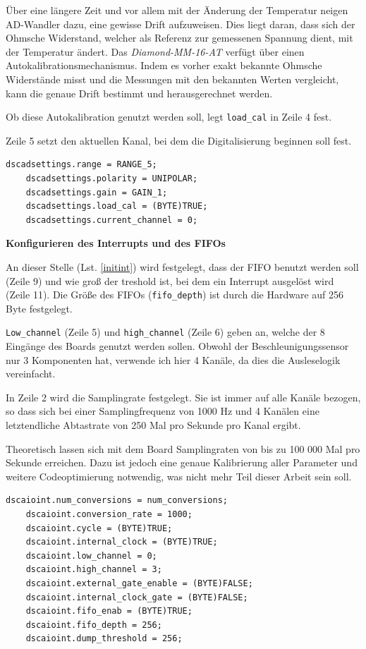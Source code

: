 \documentclass[12pt,a4paper]{scrartcl}
\begin{document}
Über eine längere Zeit und vor allem mit der Änderung der Temperatur neigen AD-Wandler dazu, eine gewisse Drift aufzuweisen. Dies liegt daran, dass sich der Ohmsche Widerstand, welcher als Referenz zur gemessenen Spannung dient, mit der Temperatur ändert. Das \textit{Diamond-MM-16-AT} verfügt über einen Autokalibrationsmechanismus. Indem es vorher exakt bekannte Ohmsche Widerstände misst und die Messungen mit den bekannten Werten vergleicht, kann die genaue Drift bestimmt und herausgerechnet werden\citep[siehe auch][]{Miller:2006fk}.

Ob diese Autokalibration genutzt werden soll, legt \texttt{load\_cal} in Zeile 4 fest.

Zeile 5 setzt den aktuellen Kanal, bei dem die Digitalisierung beginnen soll fest.

\begin{lstlisting}[frame=trBL]
	dscadsettings.range = RANGE_5;
	dscadsettings.polarity = UNIPOLAR;
	dscadsettings.gain = GAIN_1;
	dscadsettings.load_cal = (BYTE)TRUE;
	dscadsettings.current_channel = 0;
\end{lstlisting}


\textbf{Konfigurieren des Interrupts und des FIFOs}

An dieser Stelle (Lst. \ref{initint}) wird festgelegt, dass der FIFO benutzt werden soll (Zeile 9) und wie groß der treshold ist, bei dem ein Interrupt ausgelöst wird (Zeile 11). Die Größe des FIFOs (\texttt{fifo\_depth}) ist durch die Hardware auf 256 Byte festgelegt.

\texttt{Low\_channel} (Zeile 5) und \texttt{high\_channel} (Zeile 6) geben an, welche der 8 Eingänge des Boards genutzt werden sollen. Obwohl der Beschleunigungssensor nur 3 Komponenten hat, verwende ich hier 4 Kanäle, da dies die Ausleselogik vereinfacht.

In Zeile 2 wird die Samplingrate festgelegt. Sie ist immer auf alle Kanäle bezogen, so dass sich bei einer Samplingfrequenz von 1000 Hz und 4 Kanälen eine letztendliche Abtastrate von 250 Mal pro Sekunde pro Kanal ergibt. 

Theoretisch lassen sich mit dem Board Samplingraten von bis zu 100 000 Mal pro Sekunde erreichen. Dazu ist jedoch eine genaue Kalibrierung aller Parameter und weitere Codeoptimierung notwendig, was nicht mehr Teil dieser Arbeit sein soll. \\


\begin{lstlisting}[frame=trBL]
	dscaioint.num_conversions = num_conversions;
	dscaioint.conversion_rate = 1000;
	dscaioint.cycle = (BYTE)TRUE;
	dscaioint.internal_clock = (BYTE)TRUE;
	dscaioint.low_channel = 0;
	dscaioint.high_channel = 3;
	dscaioint.external_gate_enable = (BYTE)FALSE;
	dscaioint.internal_clock_gate = (BYTE)FALSE;
	dscaioint.fifo_enab = (BYTE)TRUE;
	dscaioint.fifo_depth = 256;
	dscaioint.dump_threshold = 256;
\end{lstlisting}
\end{document}
